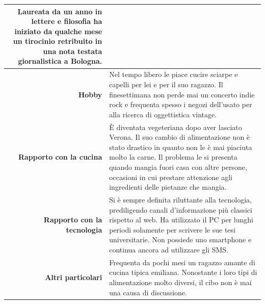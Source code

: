 \begin{table}[H]
\begin{centering}
\begin{tabular} { | r  p{10cm} | }
Laureata da un anno in lettere e filosofia ha iniziato da qualche mese
un tirocinio retribuito in una nota testata giornalistica a Bologna. \\\hline
		\textbf{Hobby} & Nel tempo libero le piace cucire sciarpe e
capelli per lei e per il suo ragazzo. Il finesettimana non perde mai un
concerto indie rock e frequenta spesso i negozi dell'usato per alla
ricerca di oggettistica vintage. \\ \hline
		\textbf{Rapporto con la cucina} & È diventata vegeteriana dopo
aver lasciato Verona. Il suo cambio di alimentazione non è stato
drastico in quanto non le è mai piaciuta molto la carne. Il problema le
si presenta quando mangia fuori casa con altre persone, occasioni in cui
prestare attenzione agli ingredienti delle pietanze che mangia. \\ \hline
		\textbf{Rapporto con la tecnologia} & Si è sempre definita
riluttante alla tecnologia, prediligendo canali d'informazione più
classici rispetto al web. Ha utilizzato il PC per lunghi periodi
solamente per scrivere le sue tesi universitarie. Non possiede uno
smartphone e continua ancora ad utilizzare gli SMS.\\ \hline
		\textbf{Altri particolari} & Frequenta da pochi mesi un ragazzo
amante di cucina tipica emiliana. Nonostante i loro tipi di
alimentazione molto diversi, il cibo non è mai una causa di discussione. \\\hline
	\end{tabular}
	\end{centering}
\end{table}

